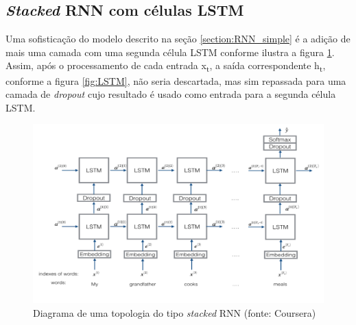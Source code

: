 \subsection{\textit{Stacked} RNN com células LSTM}

Uma sofisticação do modelo descrito na seção \ref{section:RNN_simple} é a adição de mais uma camada com uma segunda célula LSTM conforme ilustra a figura \ref{fig:StackedRNN}. Assim, após o processamento de cada entrada
x\textsubscript{t}, a saída correspondente h\textsubscript{t}, conforme a figura \ref{fig:LSTM}, não seria descartada, mas sim repassada para uma camada de \textit{dropout} cujo resultado é usado como entrada para a segunda célula LSTM.

\begin{figure}[!ht]
	\centering
	\includegraphics[width=1.0\textwidth]{figures/StackedRNN.png}
	\caption{Diagrama de uma topologia do tipo \textit{stacked} RNN (fonte: Coursera)}
	\label{fig:StackedRNN}
\end{figure}